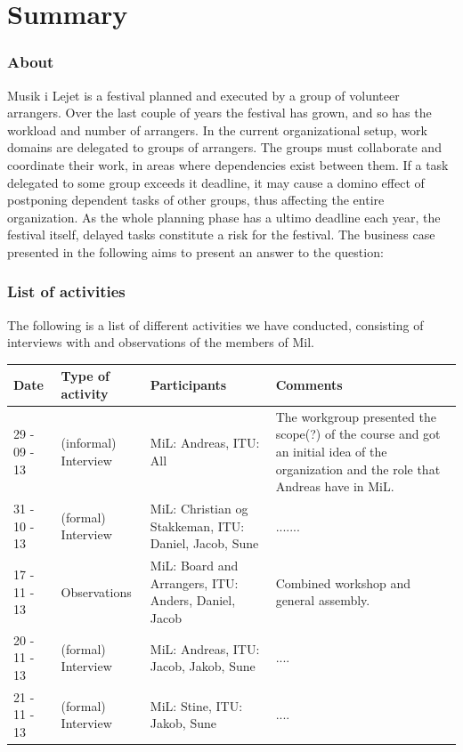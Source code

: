 \part{Summary}

\section{About}
Musik i Lejet is a festival planned and executed by a group of volunteer arrangers. Over the last couple of years the festival has grown, and so has the workload and number of arrangers. In the current organizational setup, work domains are delegated to groups of arrangers. The groups must collaborate and coordinate their work, in areas where dependencies exist between them. If a task delegated to some group exceeds it deadline, it may cause a domino effect of postponing dependent tasks of other groups, thus affecting the entire organization. As the whole planning phase has a ultimo deadline each year, the festival itself, delayed tasks constitute a risk for the festival. The business case presented in the following aims to present an answer to the question:
\\
\begin{center}
\end{center}


\section{List of activities}
The following is a list of different activities we have conducted, consisting of interviews with and observations of the members of Mil.
\begin{center}
\begin{table}[H]
    \begin{tabular}{|p{3cm}|p{3cm}|p{3cm}|p{6cm}|}
    \hline
    \textbf{Date} & \textbf{Type of activity} & \textbf{Participants} & \textbf{Comments} \\ \hline
    29 - 09 - 13 & (informal) Interview & MiL: Andreas, ITU: All & The workgroup presented the scope(?) of the course and got an initial idea of the organization and the role that Andreas have in MiL.  \\ \hline
    31 - 10 - 13 & (formal) Interview & MiL: Christian og Stakkeman, ITU: Daniel, Jacob, Sune &  .......  \\ \hline
    17 - 11 - 13 & Observations & MiL: Board and Arrangers, ITU: Anders, Daniel, Jacob & Combined workshop and general assembly. \\ \hline
    20 - 11 - 13 & (formal) Interview & MiL: Andreas, ITU: Jacob, Jakob, Sune & .... \\ \hline
    21 - 11 - 13 & (formal) Interview & MiL: Stine, ITU: Jakob, Sune & .... \\ \hline
    \end{tabular}
\end{table}
\end{center}

